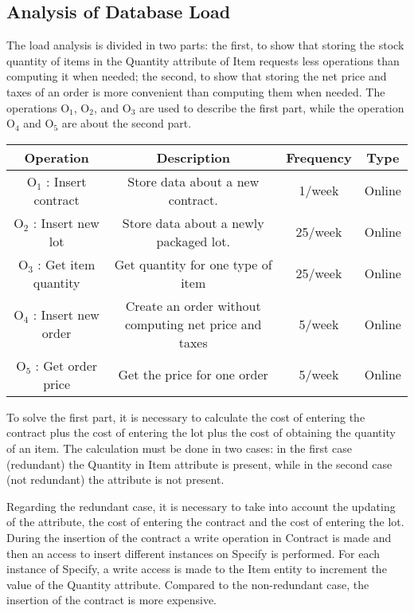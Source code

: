 \newpage
\subsection{Analysis of Database Load}
The load analysis is divided in two parts: the first, to show that storing the stock quantity of items in the Quantity attribute of Item requests less operations than computing it when needed; the second, to show that storing the net price and taxes of an order is more convenient than computing them when needed.
The operations $ \textrm{O}_\textrm{1} $, $ \textrm{O}_\textrm{2} $, and $ \textrm{O}_\textrm{3} $ are used to describe the first part, while the operation $ \textrm{O}_\textrm{4} $ and $ \textrm{O}_\textrm{5} $ are about the second part.
\begin{table}[!h]
	\begin{center}
		\begin{tabular}{ | c | c | c | c | }
			\hline
			\textbf{Operation} & \textbf{Description} & \textbf{Frequency} & \textbf{Type} \\ \hline
			$ \textrm{O}_\textrm{1} $ : Insert contract & Store data about a new contract. & 1/week & Online \\ \hline
			$ \textrm{O}_\textrm{2} $ : Insert new lot & Store data about a newly packaged lot. & 25/week & Online \\ \hline
			$ \textrm{O}_\textrm{3} $ : Get item quantity  & Get quantity for one type of item & 25/week & Online \\\hline
			$ \textrm{O}_\textrm{4} $ : Insert new order  & Create an order without computing net price and taxes  & 5/week & Online \\\hline
			$ \textrm{O}_\textrm{5} $ : Get order price  & Get the price for one order & 5/week & Online \\\hline
		\end{tabular}
	\end{center}
\end{table}

To solve the first part, it is necessary to calculate the cost of entering the contract plus the cost of entering the lot plus the cost of obtaining the quantity of an item. The calculation must be done in two cases: in the first case (redundant) the Quantity in Item attribute is present, while in the second case (not redundant) the attribute is not present.

Regarding the redundant case, it is necessary to take into account the updating of the attribute, the cost of entering the contract and the cost of entering the lot.
During the insertion of the contract a write operation in Contract is made and then an access to insert different instances on Specify is performed. For each instance of Specify, a write access is made to the Item entity to increment the value of the Quantity attribute. Compared to the non-redundant case, the insertion of the contract is more expensive.

